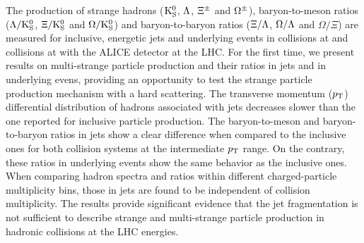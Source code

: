 The production of strange hadrons (${\rm K}^{0}_{\rm{S}}$, $\Lambda$, $\Xi^{\pm}$ and $\Omega^{\pm}$), baryon-to-meson ratios ($\Lambda/{\rm K}^{0}_{\rm{S}}$, $\Xi/{\rm K}^{0}_{\rm{S}}$ and $\Omega/{\rm K}^{0}_{\rm{S}}$) and baryon-to-baryon ratios ($\Xi/\Lambda$, $\Omega/\Lambda$ and $\Omega/\Xi$) are measured for inclusive, energetic jets and underlying events in \pp collisions at \thirteen and \pPb collisions at \fivenn with the ALICE detector at the LHC.
For the first time, we present results on multi-strange particle production and their ratios in jets and in underlying evens, providing an opportunity to test the strange particle production mechanism with a hard scattering.
The transverse momentum ($p_{\rm T}$) differential distribution of hadrons associated with jets decreases slower than the one reported for inclusive particle production.
The baryon-to-meson and baryon-to-baryon ratios in jets show a clear difference when compared to the inclusive ones for both collision systems at the intermediate $p_{\rm T}$ range.
On the contrary, these ratios in underlying events show the same behavior as the inclusive ones.
When comparing hadron spectra and ratios within different charged-particle multiplicity bins, those in jets are found to be independent of collision multiplicity.
The results provide significant evidence that the jet fragmentation is not sufficient to describe strange and multi-strange particle production in hadronic collisions at the LHC energies.